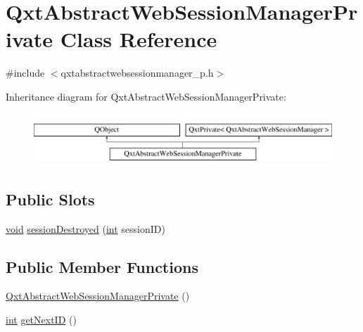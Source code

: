 \hypertarget{class_qxt_abstract_web_session_manager_private}{\section{Qxt\-Abstract\-Web\-Session\-Manager\-Private Class Reference}
\label{class_qxt_abstract_web_session_manager_private}
}


{\ttfamily \#include $<$qxtabstractwebsessionmanager\-\_\-p.\-h$>$}

Inheritance diagram for Qxt\-Abstract\-Web\-Session\-Manager\-Private\-:\begin{figure}[H]
\begin{center}
\leavevmode
\includegraphics[height=1.937716cm]{class_qxt_abstract_web_session_manager_private}
\end{center}
\end{figure}
\subsection*{Public Slots}
\begin{DoxyCompactItemize}
\item 
\hyperlink{group___u_a_v_objects_plugin_ga444cf2ff3f0ecbe028adce838d373f5c}{void} \hyperlink{class_qxt_abstract_web_session_manager_private_ace933ba4998fdb21797c087ac1d2dd99}{session\-Destroyed} (\hyperlink{ioapi_8h_a787fa3cf048117ba7123753c1e74fcd6}{int} session\-I\-D)
\end{DoxyCompactItemize}
\subsection*{Public Member Functions}
\begin{DoxyCompactItemize}
\item 
\hyperlink{class_qxt_abstract_web_session_manager_private_a810096f11be2c9611d89879ad441ae67}{Qxt\-Abstract\-Web\-Session\-Manager\-Private} ()
\item 
\hyperlink{ioapi_8h_a787fa3cf048117ba7123753c1e74fcd6}{int} \hyperlink{class_qxt_abstract_web_session_manager_private_ab6b3f51e284419bbb4e822d199b968ef}{get\-Next\-I\-D} ()
\end{DoxyCompactItemize}
